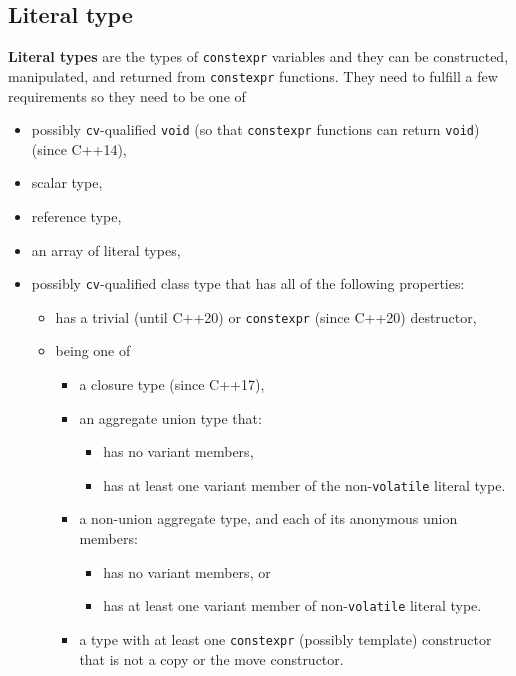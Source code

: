 \documentclass[../main]{subfiles}
\begin{document}
\subsection{Literal type}
    \textbf{Literal types} are the types of \texttt{constexpr} variables and they can be constructed, manipulated, and returned from \texttt{constexpr} functions.
They need to fulfill a few requirements so they need to be one of
\begin{itemize}
    \item possibly \texttt{cv}-qualified \texttt{void} (so that \texttt{constexpr} functions can return \texttt{void}) (since C++14),
    \item scalar type,
    \item reference type,
    \item an array of literal types,
    \item possibly \texttt{cv}-qualified class type that has all of the following properties:
    \begin{itemize}
        \item has a trivial (until C++20) or \texttt{constexpr} (since C++20) destructor,
        \item being one of
        \begin{itemize}
            \item a closure type (since C++17),
            \item an aggregate union type that:
            \begin{itemize}
                \item has no variant members,
                \item has at least one variant member of the non-\texttt{volatile} literal type.
            \end{itemize}
            \item a non-union aggregate type, and each of its anonymous union members:
            \begin{itemize}
                \item has no variant members, or
                \item has at least one variant member of non-\texttt{volatile} literal type.
            \end{itemize}
            \item a type with at least one \texttt{constexpr} (possibly template) constructor that is not a copy or the move constructor.
        \end{itemize}
    \end{itemize}
\end{itemize}
\end{document}
